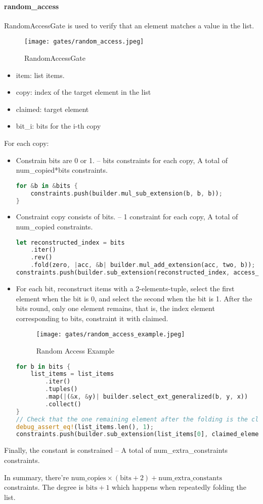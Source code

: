 \paragraph{random\_access}

\hspace*{\fill}

\indent RandomAccessGate is used to verify that an element matches a value in the list.

\begin{figure}[!ht]
    \centering
    \texttt{[image: gates/random\_access.jpeg]}
    \caption{RandomAccessGate}
    \label{fig:random-access}
\end{figure}

\begin{itemize}
    \item item: list items.
    \item copy: index of the target element in the list
    \item claimed: target element
    \item bit\_i: bits for the i-th copy
\end{itemize}

For each copy:
\begin{itemize}
    \item Constrain bits are 0 or 1. -- bits constraints for each copy, A total of num\_copied*bits constraints.
    \begin{lstlisting}[language=rust]
for &b in &bits {
    constraints.push(builder.mul_sub_extension(b, b, b));
}
    \end{lstlisting}
    \item Constraint copy consists of bits. -- 1 constraint for each copy, A total of num\_copied constraints.
    \begin{lstlisting}[language=rust]
let reconstructed_index = bits
    .iter()
    .rev()
    .fold(zero, |acc, &b| builder.mul_add_extension(acc, two, b));
constraints.push(builder.sub_extension(reconstructed_index, access_index));
    \end{lstlisting}
    \item For each bit, reconstruct items with a 2-elements-tuple, select the first element when the bit is 0, and select the second when the bit is 1.
    After the bits round, only one element remains, that is, the index element corresponding to bits, constraint it with claimed.
    \begin{figure}[!ht]
        \centering
        \texttt{[image: gates/random\_access\_example.jpeg]}
        \caption{Random Access Example}
        \label{fig:random-access-example}
    \end{figure}
    \begin{lstlisting}[language=rust]
for b in bits {
    list_items = list_items
        .iter()
        .tuples()
        .map(|(&x, &y)| builder.select_ext_generalized(b, y, x))
        .collect()
}
// Check that the one remaining element after the folding is the claimed element.
debug_assert_eq!(list_items.len(), 1);
constraints.push(builder.sub_extension(list_items[0], claimed_element));
    \end{lstlisting}
\end{itemize}

Finally, the constant is constrained -- A total of num\_extra\_constraints constraints.

In summary, there're $\text{num\_copies} \times (\text{bits} + 2) + \text{num\_extra\_constants}$ constraints. The degree is $\text{bits} + 1$ which happens when repeatedly folding the list. 
